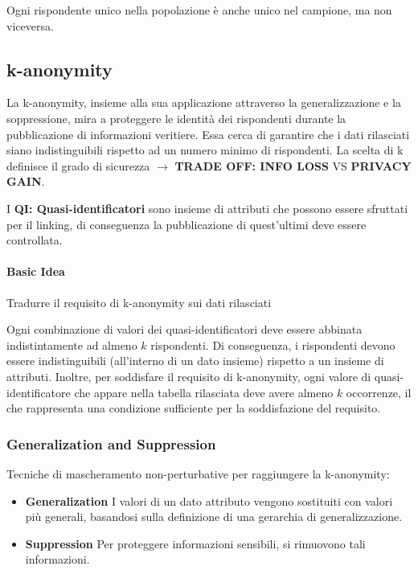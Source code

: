 \documentclass{report}
\begin{document}
\noindent Ogni rispondente unico nella popolazione è anche unico nel campione, ma non viceversa.

\subsection{k-anonymity}
La k-anonymity, insieme alla sua applicazione attraverso la generalizzazione e la soppressione, mira a proteggere le identità dei rispondenti durante la pubblicazione di informazioni veritiere. 
Essa cerca di garantire che i dati rilasciati siano indistinguibili rispetto ad un numero minimo di rispondenti. 
La scelta di k definisce il grado di sicurezza $ \rightarrow $ \textbf{TRADE OFF: INFO LOSS} VS \textbf{PRIVACY GAIN}.

\noindent I \textbf{QI: Quasi-identificatori} sono insieme di attributi che possono essere sfruttati per il linking, di conseguenza la pubblicazione di quest'ultimi deve essere controllata.

\paragraph{Basic Idea} Tradurre il requisito di k-anonymity sui dati rilasciati

\noindent Ogni combinazione di valori dei quasi-identificatori deve essere abbinata indistintamente ad almeno \( k \) rispondenti. 
Di conseguenza, i rispondenti devono essere indistinguibili (all'interno di un dato insieme) rispetto a un insieme di attributi. 
Inoltre, per soddisfare il requisito di k-anonymity, ogni valore di quasi-identificatore che appare nella tabella rilasciata deve avere almeno \( k \) occorrenze, il che rappresenta una condizione sufficiente per la soddisfazione del requisito.

\subsubsection{Generalization and Suppression}
Tecniche di mascheramento non-perturbative per raggiungere la k-anonymity:
\begin{itemize} 
\item \textbf{Generalization} I valori di un dato attributo vengono sostituiti con valori più generali, basandosi sulla definizione di una gerarchia di generalizzazione.
\item \textbf{Suppression} Per proteggere informazioni sensibili, si rimuovono tali informazioni. 
\end{itemize}
\end{document}
